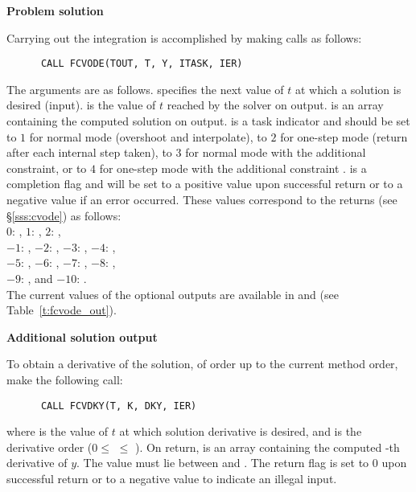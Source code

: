 \begin{Steps}
\item {\bf Problem solution}

  Carrying out the integration is accomplished by making calls as follows:
\begin{verbatim}
      CALL FCVODE(TOUT, T, Y, ITASK, IER)
\end{verbatim}
  The arguments are as follows.
   specifies the next value of $t$ at which a solution is desired (input).
   is the value of $t$ reached by the solver on output.
   is an array containing the computed solution on output.
   is a task indicator and should be set to $1$ for normal mode 
  (overshoot  and interpolate), to $2$ for one-step mode 
  (return after each internal step taken), to $3$ for normal mode with
  the additional  constraint, or to $4$ for one-step mode 
  with the additional constraint .
   is a completion flag and will be set to a positive value upon
  successful return or to a negative value if an error occurred. These values
  correspond to the  returns (see \S\ref{sss:cvode}) as follows:\\
  $0$: , 
  $1$: , 
  $2$: ,\\
  $-1$: , 
  $-2$: , 
  $-3$: ,
  $-4$: , \\
  $-5$: ,
  $-6$: , 
  $-7$: ,
  $-8$: , \\
  $-9$: , and
  $-10$: .\\
  The current values of the optional outputs are available in  and
   (see Table~\ref{t:fcvode_out}).
  
\item {\bf Additional solution output}

  To obtain a derivative of the solution, of order up to the current method
  order, make the following call:
\begin{verbatim}
      CALL FCVDKY(T, K, DKY, IER)
\end{verbatim}
  where
   is the value of $t$ at which solution derivative is desired, and
   is the derivative order ($0 \le$  $\le$ ).
  On return,  is an array containing the computed -th derivative
  of $y$.  The value  must lie between  and .
  The return flag  is set to $0$ upon successful return or to a negative
  value to indicate an illegal input.
  

\end{Steps}
